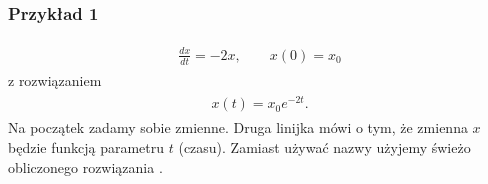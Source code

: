 \documentclass[a4paper,12pt,polish]{sphinxmanual}
\begin{document}
\subsubsection{Przykład 1}
\label{ch1/chI012:id1}\label{ch1/chI012:equation-eqn12}\begin{gather}
\begin{split}\frac{dx}{dt}=-2x, \qquad x(0) = x_0\end{split}\label{ch1/chI012-eqn12}
\end{gather}
z rozwiązaniem
\label{ch1/chI012:equation-eqn13}\begin{gather}
\begin{split}x(t) = x_0   e^{-2t}.\end{split}\label{ch1/chI012-eqn13}
\end{gather}
Na początek zadamy sobie zmienne. Druga linijka mówi o tym, że zmienna $x$ będzie funkcją parametru $t$ (czasu). Zamiast
używać nazwy  użyjemy świeżo obliczonego rozwiązania .
\end{document}
